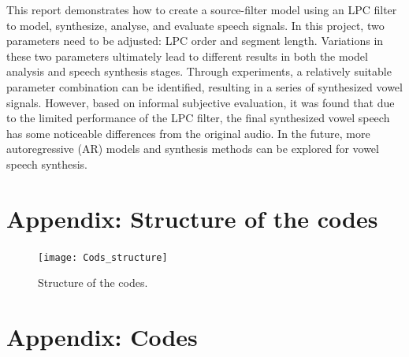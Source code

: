 \documentclass{article}
\begin{document}
This report demonstrates how to create a source-filter model using an LPC filter to model, synthesize, analyse, and evaluate speech signals. In this project, two parameters need to be adjusted: LPC order and segment length. Variations in these two parameters ultimately lead to different results in both the model analysis and speech synthesis stages. Through experiments, a relatively suitable parameter combination can be identified, resulting in a series of synthesized vowel signals. However, based on informal subjective evaluation, it was found that due to the limited performance of the LPC filter, the final synthesized vowel speech has some noticeable differences from the original audio. In the future, more autoregressive (AR) models and synthesis methods can be explored for vowel speech synthesis.


\newcommand{\doi}[1]{DOI: \href{http://dx.doi.org/#1}{\nolinkurl{#1}}}



\newpage
\appendix
\section{Appendix: Structure of the codes}

\begin{figure}[h]
\begin{center}
\texttt{[image: Cods\_structure]}
\end{center}
\caption{\label{fig:Cods_structure} Structure of the codes.}
\end{figure}

\section{Appendix: Codes}
\end{document}

